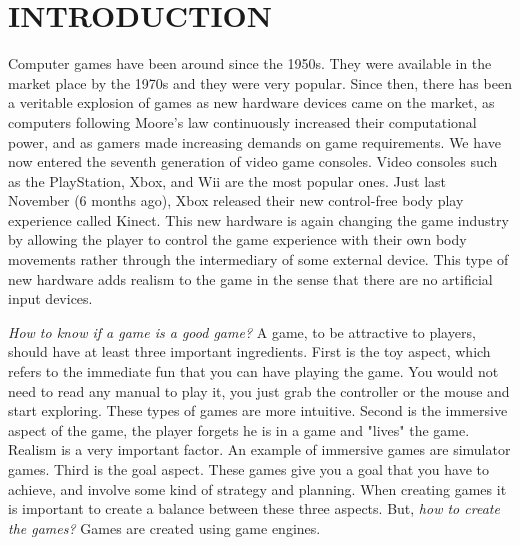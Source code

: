 \chapter{INTRODUCTION}\label{chap1}








Computer games have been around since the 1950s. They were available in the market place by the 1970s and they were very popular. Since then, there has been a veritable explosion of games as new hardware devices came on the market, as computers following Moore's law continuously increased their computational power, and as gamers made increasing demands on game requirements. We have now entered the seventh generation of video game consoles\cite{usingVideoGames}. Video consoles such as the PlayStation, Xbox, and Wii are the most popular ones. Just last November (6 months ago), Xbox released their new control-free body play experience called Kinect\cite{kinect}. This new hardware is again changing the game industry by allowing the player to control the game experience with their own body movements rather through the intermediary of some external device. This type of new hardware adds realism to the game in the sense that there are no artificial input devices.

\textit{How to know if a game is a good game?} A game, to be attractive to players, should have at least three important ingredients\cite{bookGameKit2}. First is the toy aspect, which refers to the immediate fun that you can have playing the game. You would not need to read any manual to play it, you just grab the controller or the mouse and start exploring. These types of games are more intuitive. Second is the immersive aspect of the game, the player forgets he is in a game and "lives" the game. Realism is a very important factor. An example of immersive games are simulator games. Third is the goal aspect. These games give you a goal that you have to achieve, and involve some kind of strategy and planning. When creating games it is important to create a balance between these three aspects. But, \textit{how to create the games?} Games are created using game engines.

